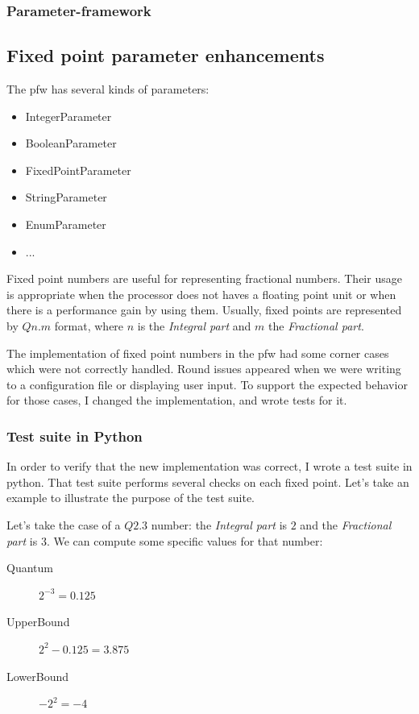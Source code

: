 \subsubsection{Parameter-framework}


\subsection{Fixed point parameter enhancements}
The \gls{pfw} has several kinds of parameters:
\begin{itemize}
    \item IntegerParameter
    \item BooleanParameter
    \item FixedPointParameter
    \item StringParameter
    \item EnumParameter
    \item ...
\end{itemize}

Fixed point numbers are useful for representing fractional numbers. Their
usage is appropriate when the processor does not haves a floating point unit
or when there is a performance gain by using them. Usually, fixed points are
represented by $Qn.m$ format, where $n$ is the \emph{Integral part} and $m$ the
\emph{Fractional part}.

The implementation of fixed point numbers in the \gls{pfw} had some
corner cases which were not correctly handled. Round issues appeared when we
were writing to a configuration file or displaying user input. To
support the expected behavior for those cases, I changed the implementation, and
wrote tests for it.

\subsubsection{Test suite in Python}

In order to verify that the new implementation was correct, I wrote a test suite
in \gls{python}. That test suite performs several checks on each fixed point. Let's
take an example to illustrate the purpose of the test suite.

Let's take the case of a $Q2.3$ number: the \emph{Integral part} is $2$ and the
\emph{Fractional part} is $3$. We can compute some specific values for that number:

\begin{description}
    \item[Quantum] $2^{-3} = 0.125$
    \item[UpperBound] $2^2 - 0.125 = 3.875$
    \item[LowerBound] $-2^2 = -4$
\end{description}

